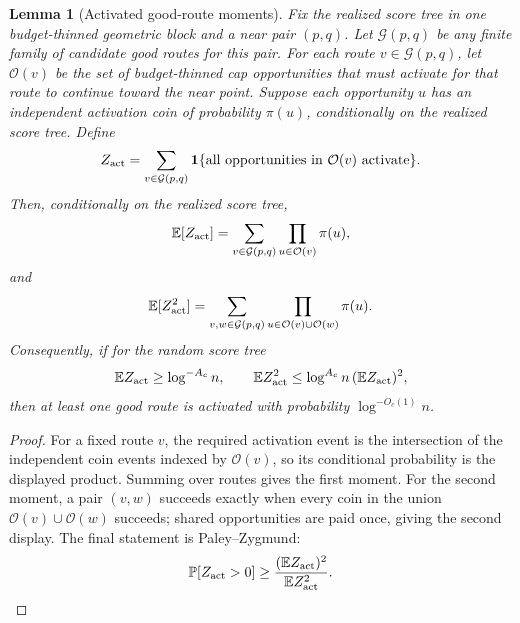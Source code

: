 \documentclass[10pt]{article}
\newtheorem{lemma}[theorem]{Lemma}
\theoremstyle{definition}
\newcommand{\E}{\mathbb{E}}
\newcommand{\Prb}{\mathbb{P}}
\begin{document}
\begin{lemma}[Activated good-route moments]\label{lem:activated-good-route-moments}
   Fix the realized score tree in one budget-thinned geometric block and a near
   pair $(p,q)$. Let $\mathcal G(p,q)$ be any finite family of candidate good
   routes for this pair. For each route $v\in\mathcal G(p,q)$, let
   $\mathcal O(v)$ be the set of budget-thinned cap opportunities that must
   activate for that route to continue toward the near point. Suppose each
   opportunity $u$ has an independent activation coin of probability $\pi(u)$,
   conditionally on the realized score tree. Define
   \[
      Z_{\rm act}
      =
      \sum_{v\in\mathcal G(p,q)}
      \mathbf 1\{\text{all opportunities in }\mathcal O(v)\text{ activate}\}.
   \]
   Then, conditionally on the realized score tree,
   \[
      \E[Z_{\rm act}]
      =
      \sum_{v\in\mathcal G(p,q)}
      \prod_{u\in\mathcal O(v)}\pi(u),
   \]
   and
   \[
      \E[Z_{\rm act}^2]
      =
      \sum_{v,w\in\mathcal G(p,q)}
      \prod_{u\in\mathcal O(v)\cup\mathcal O(w)}\pi(u).
   \]
   Consequently, if for the random score tree
   \[
      \E Z_{\rm act}\ge \log^{-A_c}n,
      \qquad
      \E Z_{\rm act}^2\le \log^{A_c}n\,(\E Z_{\rm act})^2,
   \]
   then at least one good route is activated with probability
   $\log^{-O_c(1)}n$.
\end{lemma}

\begin{proof}
   For a fixed route $v$, the required activation event is the intersection of
   the independent coin events indexed by $\mathcal O(v)$, so its conditional
   probability is the displayed product. Summing over routes gives the first
   moment. For the second moment, a pair $(v,w)$ succeeds exactly when every
   coin in the union $\mathcal O(v)\cup\mathcal O(w)$ succeeds; shared
   opportunities are paid once, giving the second display. The final statement
   is Paley--Zygmund:
   \[
      \Prb[Z_{\rm act}>0]\ge
      \frac{(\E Z_{\rm act})^2}{\E Z_{\rm act}^2}.
   \]
\end{proof}
\end{document}
